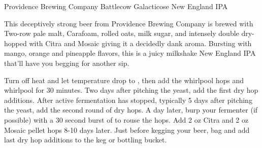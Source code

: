 \begin{recipie}{Providence Brewing Company Battlecow Galacticose New England IPA}

\begin{aboutblock}
This deceptively strong beer from Providence Brewing Company is brewed with Two-row pale
malt, Cara\-foam, rolled oats, milk sugar, and intensely double dry-hopped with Citra and
Mosaic giving it a decidedly dank aroma. Bursting with mango, orange and pineapple flavors,
this is a juicy milkshake New England IPA that'll have you begging for another sip.
\end{aboutblock}


\begin{methodandtiming}
 
\begin{mashsteps}
\end{mashsteps}

\begin{fermentationsteps}
\end{fermentationsteps}

\begin{directions}
Turn off heat and let temperature drop to , then add the whirlpool hops and
whirlpool for 30 minutes. Two days after pitching the yeast, add the first dry hop
additions. After active fermentation has stopped, typically 5 days after pitching the
yeast, add the second round of dry hops. A day later, burp your fermenter (if possible)
with a 30 second burst of  to rouse the hops. Add 2 oz Citra and 2 oz Mosaic pellet hops 8-10 days later. Just before kegging your beer, bag and add last dry hop additions to the keg or bottling bucket.
\end{directions}

\end{methodandtiming}

\pagebreak

\begin{ingredientsblock}

\begin{malts}
\end{malts}


\end{ingredientsblock}
\end{recipie}
